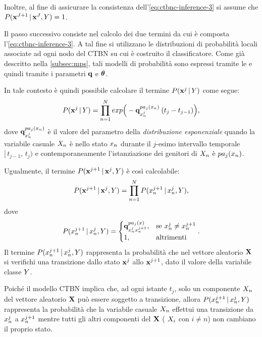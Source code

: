 Inoltre, al fine di assicurare la consistenza dell'\autoref{eq:ctbnc-inference-3} si assume che $P(\mathbf{x}^{J+1}\,\arrowvert\,\mathbf{x}^J,\mathnormal{Y})=1$.

Il passo successivo consiste nel calcolo dei due termini da cui è composta l'\autoref{eq:ctbnc-inference-3}. A tal fine si utilizzano le distribuzioni di probabilità locali associate ad ogni nodo del \acs{CTBN} su cui è costruito il classificatore. Come già descritto nella \autoref{subsec:mps}, tali modelli di probabilità sono espressi tramite le \cim{} e quindi tramite i parametri $\boldsymbol{\textbf{\text{q}}}$ e $\boldsymbol{\textbf{\text{$\theta$}}}$.

In tale contesto è quindi possibile calcolare il termine $P(\mathbf{x}^j\,\arrowvert\,\mathnormal{Y})$ come segue:
\begin{equation}\label{eq:ctbnc-inference-4}
P(\mathbf{x}^j\,\arrowvert\,\mathnormal{Y})=\prod_{n=1}^N exp\Big(-\boldsymbol{\textbf{\text{q}}}_{\mathnormal{x}_n^j}^{pa_j(\mathnormal{x}_n)}\:(t_j - t_{j-1})\Big)\text{,}
\end{equation}
dove $\boldsymbol{\textbf{\text{q}}}_{\mathnormal{x}_n^j}^{pa_j(\mathnormal{x}_n)}$ è il valore del parametro della \emph{distribuzione esponenziale} quando la variabile casuale $\mathnormal{X}_n$ è nello stato $\mathnormal{x}_n$ durante il $j$-esimo intervallo temporale $[\,t_{j-1},\,t_j)$ e contemporaneamente l'istanziazione dei genitori di $\mathnormal{X}_n$ è $pa_j(\mathnormal{x}_n)$.

Ugualmente, il termine $P(\mathbf{x}^{j+1}\,\arrowvert\,\mathbf{x}^j,\mathnormal{Y})$ è così calcolabile:
\begin{equation}\label{eq:ctbnc-inference-5}
P(\mathbf{x}^{j+1}\,\arrowvert\,\mathbf{x}^j,\mathnormal{Y})=\prod_{n=1}^N P(\mathnormal{x}_n^{j+1}\,\arrowvert\,\mathnormal{x}_n^j,\mathnormal{Y})\text{,}
\end{equation}
dove
\begin{equation}\label{eq:ctbnc-inference-6}
P(\mathnormal{x}_n^{j+1}\,\arrowvert\,\mathnormal{x}_n^j,\mathnormal{Y})=
\begin{cases}
\boldsymbol{\textbf{\text{q}}}_{\mathnormal{x}_n^j\mathnormal{x}_n^{j+1}}^{pa_j(\mathnormal{x})}, & \text{se } \mathnormal{x}_n^j \neq \mathnormal{x}_n^{j+1} \\
1, & \text{altrimenti}
\end{cases}\text{.}
\end{equation}
Il termine $P(\mathnormal{x}_n^{j+1}\,\arrowvert\,\mathnormal{x}_n^j,\mathnormal{Y})$ rappresenta la probabilità che nel vettore aleatorio $\mathbf{X}$ si verifichi una transizione dallo stato $\mathbf{x}^j$ allo $\mathbf{x}^{j+1}$, dato il valore della variabile classe $\mathnormal{Y}$.

Poiché il modello \acs{CTBN} implica che, ad ogni istante $t_j$, solo un componente $\mathnormal{X}_n$ del vettore aleatorio $\mathbf{X}$ può essere soggetto a transizione, allora $P(\mathnormal{x}_n^{j+1}\,\arrowvert\,\mathnormal{x}_n^j,\mathnormal{Y})$ rappresenta la probabilità che la variabile casuale $\mathnormal{X}_n$ effettui una transizione da $\mathnormal{x}_n^j$ a $\mathnormal{x}_n^{j+1}$ mentre tutti gli altri componenti del  $\mathbf{X}$ (\ie{} $\mathnormal{X}_i$ con $i \neq n$) non cambiano il proprio stato.

